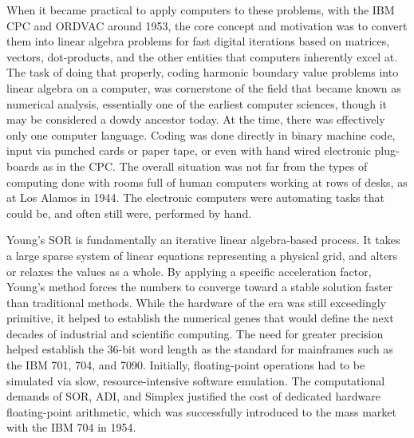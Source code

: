 When it became practical to apply computers to these problems, with the IBM CPC and ORDVAC around 1953, the core concept and motivation was to convert them into linear algebra problems for fast digital iterations based on matrices, vectors, dot-products, and the other entities that computers inherently excel at. The task of doing that properly, coding harmonic boundary value problems into linear algebra on a computer, was cornerstone of the field that became known as numerical analysis, essentially one of the earliest computer sciences, though it may be considered a dowdy ancestor today. At the time, there was effectively only one computer language. Coding was done directly in binary machine code, input via punched cards or paper tape, or even with hand wired electronic plug-boards as in the CPC. The overall situation was not far from the types of computing done with rooms full of human computers working at rows of desks, as at Los Alamos in 1944. The electronic computers were automating tasks that could be, and often still were, performed by hand. \cite{grierWhenComputersWere2005} \cite{gleickGeniusLifeScience1992}

Young’s SOR is fundamentally an iterative linear algebra-based process. It takes a large sparse system of linear equations representing a physical grid, and alters or relaxes the values as a whole. By applying a specific acceleration factor, Young’s method forces the numbers to converge toward a stable solution faster than traditional methods. While the hardware of the era was still exceedingly primitive, it helped to establish the numerical genes that would define the next decades of industrial and scientific computing. The need for greater precision helped establish the 36-bit word length as the standard for mainframes such as the IBM 701, 704, and 7090. Initially, floating-point operations had to be simulated via slow, resource-intensive software emulation. The computational demands of SOR, ADI, and Simplex justified the cost of dedicated hardware floating-point arithmetic, which was successfully introduced to the mass market with the IBM 704 in 1954. \cite{forsytheComputerSolutionLinear1967}


